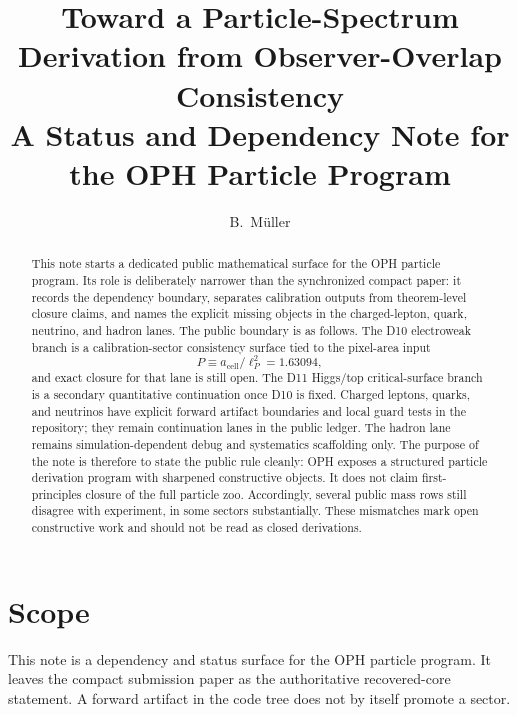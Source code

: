 \documentclass[11pt]{article}
\title{Toward a Particle-Spectrum Derivation from Observer-Overlap Consistency\\[0.4em]
\large A Status and Dependency Note for the OPH Particle Program}
\author{B.\ M\"uller}
\date{\OPHPaperReleaseDate}
\begin{document}
\maketitle
\OPHPaperReleaseBanner

\begin{abstract}
This note starts a dedicated public mathematical surface for the OPH particle
program. Its role is deliberately narrower than the synchronized compact paper:
it records the dependency boundary, separates calibration outputs from
theorem-level closure claims, and names the explicit missing objects in the
charged-lepton, quark, neutrino, and hadron lanes. The public boundary is as
follows. The D10 electroweak branch is a calibration-sector consistency
surface tied to the pixel-area input
\[
P \equiv a_{\mathrm{cell}}/\ell_P^2 = 1.63094,
\]
and exact closure for that lane is still open. The D11 Higgs/top critical-surface branch is
a secondary quantitative continuation once D10 is fixed. Charged leptons,
quarks, and neutrinos have explicit forward artifact boundaries and local guard
tests in the repository; they remain continuation lanes in the public ledger.
The hadron lane remains simulation-dependent
debug and systematics scaffolding only. The purpose of the note is therefore to
state the public rule cleanly: OPH exposes a structured particle
derivation program with sharpened constructive objects. It does not claim
first-principles closure of the full particle zoo. Accordingly, several public
mass rows still disagree with experiment, in some sectors substantially.
These mismatches mark open constructive work and should not be read as closed
derivations.
\end{abstract}

\section{Scope}

This note is a dependency and status surface for the OPH particle program. It
leaves the compact submission paper as the authoritative recovered-core
statement. A forward artifact in the code tree does not by itself promote a
sector.
\end{document}
